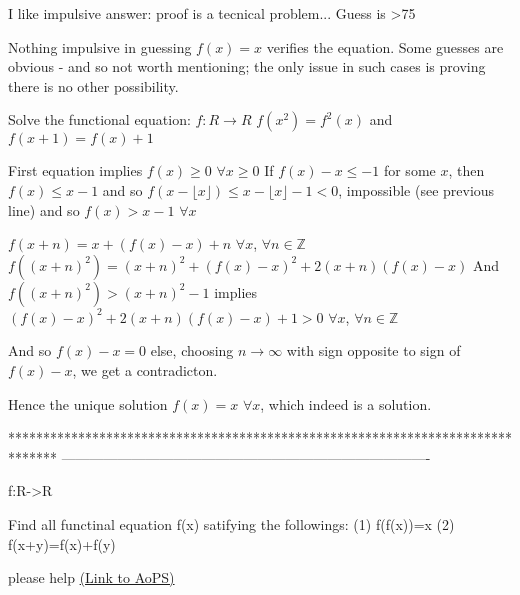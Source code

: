 \begin{solution}
	I like impulsive answer: proof is a tecnical problem... Guess is >75%
\end{solution}



\begin{solution}
	Nothing impulsive in guessing $f(x) = x$ verifies the equation. Some guesses are obvious - and so not worth mentioning; the only issue in such cases is proving there is no other possibility.
\end{solution}



\begin{solution}
	\begin{tcolorbox}Solve the functional equation:
$f: R \to R$
$f(x^2) = f^2(x)$ 
and $f(x + 1) = f(x) + 1$\end{tcolorbox}
First equation implies $f(x)\ge 0$ $\forall x\ge 0$
If $f(x)-x\le -1$ for some $x$, then $f(x)\le x-1$ and so $f(x-\lfloor x\rfloor)\le x-\lfloor x\rfloor-1<0$, impossible (see previous line) and so $f(x)> x-1$ $\forall x$

$f(x+n)=x+(f(x)-x)+n$ $\forall x$, $\forall n\in\mathbb Z$
$f((x+n)^2)=(x+n)^2+(f(x)-x)^2+2(x+n)(f(x)-x)$
And $f((x+n)^2)>(x+n)^2-1$ implies $(f(x)-x)^2+2(x+n)(f(x)-x)+1>0$ $\forall x$, $\forall n\in\mathbb Z$

And so $f(x)-x=0$ else, choosing $n\to\infty$ with sign opposite to sign of $f(x)-x$, we get a contradicton.

Hence the unique solution $\boxed{f(x)=x}$ $\forall x$, which indeed is a solution.
\end{solution}
*******************************************************************************
-------------------------------------------------------------------------------

\begin{problem}
	f:R->R

Find all functinal equation f(x) satifying the followings:
(1)  f(f(x))=x
(2) f(x+y)=f(x)+f(y)

please help
	\flushright \href{https://artofproblemsolving.com/community/c6h481793}{(Link to AoPS)}
\end{problem}



